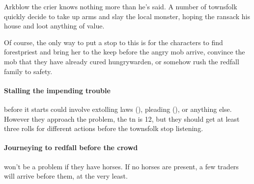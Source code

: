 Arkblow the crier knows nothing more than he's said.  A number of townsfolk quickly decide to take up arms and slay the local monster, hoping the ransack his house and loot anything of value.

Of course, the only way to put a stop to this is for the characters to find \gls{forestpriest} and bring her to the keep before the angry mob arrive, convince the mob that they have already cured \gls{hungrywarden}, or somehow rush the \gls{redfall} family to safety.

\paragraph{Stalling the impending trouble}
before it starts could involve extolling laws (), pleading (), or anything else.
However they approach the problem, the \gls{tn} is 12, but they should get at least three rolls for different actions before the townsfolk stop listening.

\paragraph{Journeying to \gls{redfall} before the crowd}
won't be a problem if they have horses.
If no horses are present, a few traders will arrive before them, at the very least.

